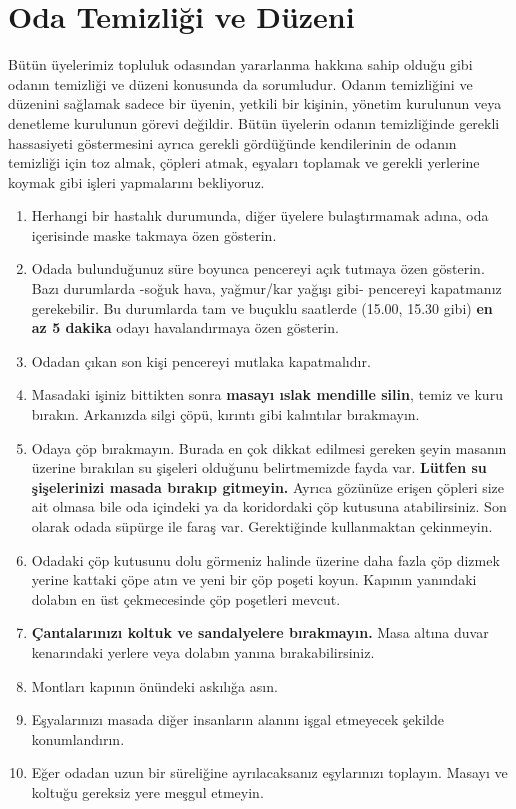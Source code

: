 \documentclass{article}
\begin{document}
\section{Oda Temizliği ve Düzeni}
Bütün üyelerimiz topluluk odasından yararlanma hakkına sahip olduğu gibi odanın temizliği ve düzeni konusunda da sorumludur. Odanın temizliğini ve düzenini sağlamak sadece bir üyenin, yetkili bir kişinin, yönetim kurulunun veya denetleme kurulunun görevi değildir. Bütün üyelerin odanın temizliğinde gerekli hassasiyeti göstermesini ayrıca gerekli gördüğünde kendilerinin de odanın temizliği için toz almak, çöpleri atmak, eşyaları toplamak ve gerekli yerlerine koymak gibi işleri yapmalarını bekliyoruz.
\begin{enumerate}
    \item Herhangi bir hastalık durumunda, diğer üyelere bulaştırmamak adına, oda içerisinde maske takmaya özen gösterin.
    \item 	Odada bulunduğunuz süre boyunca pencereyi açık tutmaya özen gösterin. Bazı durumlarda -soğuk hava, yağmur/kar yağışı gibi- pencereyi kapatmanız gerekebilir. Bu durumlarda tam ve buçuklu saatlerde (15.00, 15.30 gibi) \textbf{en az 5 dakika} odayı havalandırmaya özen gösterin. 
    \item Odadan çıkan son kişi pencereyi mutlaka kapatmalıdır.
    \item Masadaki işiniz bittikten sonra \textbf{masayı ıslak mendille silin}, temiz ve kuru bırakın. Arkanızda silgi çöpü, kırıntı gibi kalıntılar bırakmayın.
    \item Odaya çöp bırakmayın. Burada en çok dikkat edilmesi gereken şeyin masanın üzerine bırakılan su şişeleri olduğunu belirtmemizde fayda var. \textbf{Lütfen su şişelerinizi masada bırakıp gitmeyin.} Ayrıca gözünüze erişen çöpleri size ait olmasa bile oda içindeki ya da koridordaki çöp kutusuna atabilirsiniz. Son olarak odada süpürge ile faraş var. Gerektiğinde kullanmaktan çekinmeyin.
    \item Odadaki çöp kutusunu dolu görmeniz halinde üzerine daha fazla çöp dizmek yerine kattaki çöpe atın ve yeni bir çöp poşeti koyun. Kapının yanındaki dolabın en üst çekmecesinde çöp poşetleri mevcut.
    \item \textbf{Çantalarınızı koltuk ve sandalyelere bırakmayın.} Masa altına duvar kenarındaki yerlere veya dolabın yanına bırakabilirsiniz.
    \item Montları kapının önündeki askılığa asın. 
    \item Eşyalarınızı masada diğer insanların alanını işgal etmeyecek şekilde konumlandırın.
    \item Eğer odadan uzun bir süreliğine ayrılacaksanız eşylarınızı toplayın. Masayı ve koltuğu gereksiz yere meşgul etmeyin.
\end{enumerate}
\end{document}
